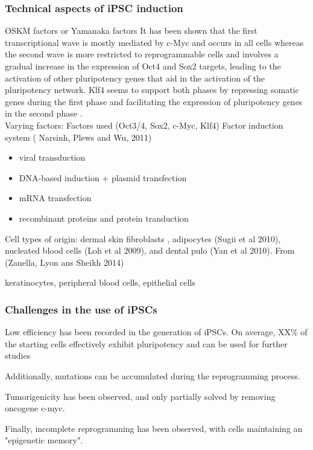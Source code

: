 \subsubsection{Technical aspects of iPSC induction}

OSKM factors or Yamanaka factors
It has been shown that the first transcriptional wave is mostly mediated by c-Myc and occurs in all cells whereas the second wave is more restricted to reprogrammable cells and involves a gradual increase in the expression of Oct4 and Sox2 targets, leading to the activation of other pluripotency genes that aid in the activation of the pluripotency network. Klf4 seems to support both phases by repressing somatic genes during the first phase and facilitating the expression of pluripotency genes in the second phase \cite{buganim2013mechanisms}.\\

Varying factors:
Factors used (Oct3/4, Sox2, c-Myc, Klf4)
Factor induction system (\cite{narsinh2011comparison} Narsinh, Plews and Wu, 2011)
\begin{itemize}
    \item viral transduction
    \item DNA-based induction + plasmid transfection
    \item mRNA transfection
    \item recombinant proteins and protein tranduction
\end{itemize}
Cell types of origin: dermal skin fibroblasts \cite{takahashi2007induction},
adipocytes (Sugii et al 2010), nucleated blood cells (Loh et al 2009),
and dental pulo (Yan et al 2010). From \cite{} (Zanella, Lyon ans Sheikh 2014)

keratinocytes, peripheral blood cells, epithelial cells


\subsubsection{Challenges in the use of iPSCs}
Low efficiency has been recorded in the generation of iPSCs.
On average, XX\% of the starting cells effectively exhibit pluripotency and can be used for further studies

Additionally, mutations can be accumulated during the reprogramming process.

Tumorigenicity has been observed, and only partially solved by removing oncogene c-myc.

Finally, incomplete reprogramming has been observed, with cells maintaining an "epigenetic memory".

